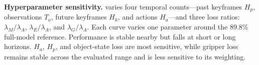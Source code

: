 \textbf{Hyperparameter sensitivity.}
 varies four temporal counts---past
keyframes $H_p$, observations $T_o$, future keyframes $H_k$, and actions
$H_a$---and three loss ratios:
$\lambda_M/\lambda_A$, $\lambda_E/\lambda_A$, and $\lambda_G/\lambda_A$.
Each curve varies one parameter around the $89.8\%$ full-model reference.
Performance is stable nearby but falls at short or long horizons. $H_a$, $H_p$,
and object-state loss are most sensitive, while gripper loss remains stable
across the evaluated range and is less sensitive to its weighting.
